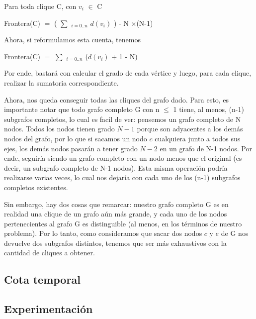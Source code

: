 \begin{center}
Para toda clique C, con ${v_i}$ $\in$ C

Frontera(C) $=$ ( $\sum$ ${_{i=0..n}}$ ${d(v_i)}$ ) - N $\times$(N-1)
\end{center}

Ahora, si reformulamos esta cuenta, tenemos 
\begin{center}
Frontera(C) $=$ $\sum$ ${_{i=0..n}}$ (${d(v_i)}$ + 1 - N)
\end{center}

Por ende, bastará con calcular el grado de cada vértice y luego, para cada clique, realizar la sumatoria correspondiente.

Ahora, nos queda conseguir todas las cliques del grafo dado. Para esto, es importante notar que todo grafo completo G con n $\leq$ 1 tiene, al menos, (n-1) subgrafos completos, lo cual es facil de ver: pensemos un grafo completo de N nodos. Todos los nodos tienen grado ${N-1}$ porque son adyacentes a los demás nodos del grafo, por lo que si sacamos un nodo ${c}$ cualquiera junto a todos sus ejes, los demás nodos pasarán a tener grado ${N-2}$ en un grafo de N-1 nodos. Por ende, seguiría siendo un grafo completo con un nodo menos que el original (es decir, un subgrafo completo de N-1 nodos). Esta misma operación podría realizarse varias veces, lo cual nos dejaría con cada uno de los (n-1) subgrafos completos existentes.

Sin embargo, hay dos cosas que remarcar: nuestro grafo completo G es en realidad una clique de un grafo aún más grande, y cada uno de los nodos pertenecientes al grafo G es distinguible (al menos, en los términos de nuestro problema). Por lo tanto, como consideramos que sacar dos nodos ${c}$ y ${e}$ de G nos devuelve dos subgrafos distintos, tenemos que ser más exhaustivos con la cantidad de cliques a obtener.

\subsection{Cota temporal}

\subsection{Experimentación}




